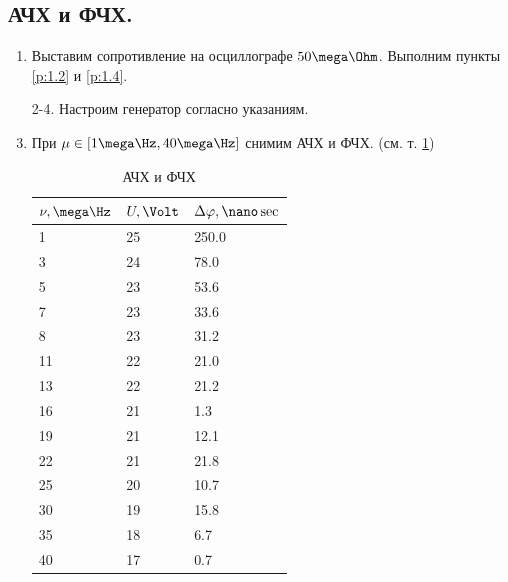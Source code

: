 \documentclass{report}
\begin{document}
\subsection{АЧХ и ФЧХ.}
\begin{enumerate}
	\item Выставим сопротивление на осциллографе $ 50 \mega\Ohm $.
	      Выполним пункты \ref{p:1.2} и \ref{p:1.4}.
	\item [2-4.] Настроим генератор согласно указаниям.
	      \setcounter{enumi}{4}
	\item При $ \mu \in [1 \mega\Hz, 40 \mega\Hz] $ снимим АЧХ и ФЧХ.
	      (см. т. \ref{table:АЧХ_ФЧХ})
	      \begin{table}[H]
		      \centering
		      \begin{tabular}{|l|l|l|}
			      \hline
			      $\nu, \mega\Hz$ & $U, \Volt$ & $\Delta \varphi, \nano\sec$ \\
			      \hline
			      1               & 25         & 250.0                       \\
			      3               & 24         & 78.0                        \\
			      5               & 23         & 53.6                        \\
			      7               & 23         & 33.6                        \\
			      8               & 23         & 31.2                        \\
			      11              & 22         & 21.0                        \\
			      13              & 22         & 21.2                        \\
			      16              & 21         & 1.3                         \\
			      19              & 21         & 12.1                        \\
			      22              & 21         & 21.8                        \\
			      25              & 20         & 10.7                        \\
			      30              & 19         & 15.8                        \\
			      35              & 18         & 6.7                         \\
			      40              & 17         & 0.7                         \\
			      \hline
		      \end{tabular}
		      \label{table:АЧХ_ФЧХ}
		      \caption{АЧХ и ФЧХ}
	      \end{table}
\end{enumerate}
\end{document}
